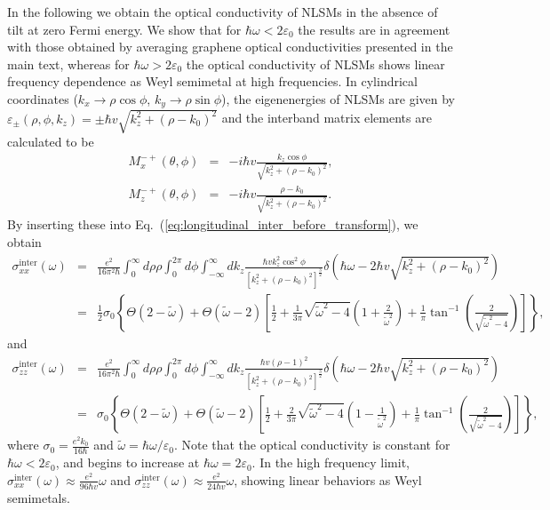 \documentclass[aps,twocolumn,floatfix]{revtex4-1}
\begin{document}
In the following we obtain the optical conductivity of NLSMs in the absence of tilt at zero Fermi energy. We show that for $\hbar\omega<2\varepsilon_0$ the results are in agreement with those obtained by averaging graphene optical conductivities presented in the main text, whereas for $\hbar\omega>2\varepsilon_0$ the optical conductivity of NLSMs shows linear frequency dependence as Weyl semimetal at high frequencies. In cylindrical coordinates ($k_x\rightarrow\rho \cos{\phi}$, $k_y\rightarrow\rho \sin{\phi}$), the eigenenergies of NLSMs are given by
$\varepsilon_\pm(\rho,\phi,k_z)=\pm \hbar v \sqrt{k_z^2 + (\rho-k_0)^2}$ and the interband matrix elements are calculated to be
\begin{eqnarray}
M_{x}^{-+}(\theta,\phi)&=&-i\hbar v\frac{k_z  \cos\phi}{\sqrt{k_z^2+(\rho-k_0)^2}},\\
M_{z}^{-+}(\theta,\phi)&=&-i\hbar v\frac{\rho-k_0 }{\sqrt{k_z^2+(\rho-k_0)^2}}.
\end{eqnarray}
By inserting these into Eq.~(\ref{eq:longitudinal_inter_before_transform}), we obtain
\begin{eqnarray}
    \sigma^\mathrm{inter}_{xx}(\omega)
    &=&
    \frac{e^2}{16\pi^2\hbar}
    \int_0^\infty d\rho \rho \int_0^{2\pi} d\phi \int_{-\infty}^\infty dk_z
    \frac{\hbar v k_z^2 \cos^2{\phi}}{[k_z^2+(\rho-k_0)^2]^{\frac{3}{2}}}
    \delta\left(\hbar\omega-2\hbar v \sqrt{k_z^2 + (\rho-k_0)^2}\right)\nonumber\\
    &=&
    \frac{1}{2}\sigma_0
    \left\{
        \Theta(2-\widetilde{\omega}) +
        \Theta(\widetilde{\omega}-2)
        \left[
            \frac{1}{2} + \frac{1}{3\pi}\sqrt{\widetilde{\omega}^2-4}
            \left(
                1+\frac{2}{\widetilde{\omega}^2}
            \right)
            +
            \frac{1}{\pi}
            \tan^{-1}\left(\frac{2}{\sqrt{\widetilde{\omega}^2-4}}\right)
        \right]
    \right\},
\end{eqnarray}
and
\begin{eqnarray}
    \sigma^\mathrm{inter}_{zz}(\omega)
    &=&
    \frac{e^2}{16\pi^2\hbar}
    \int_0^\infty d\rho \rho \int_0^{2\pi} d\phi \int_{-\infty}^\infty dk_z
    \frac{\hbar v (\rho-1)^2}{[k_z^2+(\rho-k_0)^2]^{\frac{3}{2}}}
    \delta\left(\hbar\omega-2\hbar v \sqrt{k_z^2 + (\rho-k_0)^2}\right)\nonumber\\
    &=&
    \sigma_0
    \left\{
        \Theta(2-\widetilde{\omega}) +
        \Theta(\widetilde{\omega}-2)
        \left[
            \frac{1}{2} + \frac{2}{3\pi}\sqrt{\widetilde{\omega}^2-4}
            \left(
                1-\frac{1}{\widetilde{\omega}^2}
            \right)
            +
            \frac{1}{\pi}
            \tan^{-1}\left(\frac{2}{\sqrt{\widetilde{\omega}^2-4}}\right)
        \right]
    \right\},
\end{eqnarray}
where $\sigma_0=\frac{e^2k_0}{16\hbar}$ and $\widetilde{\omega}=\hbar\omega/\varepsilon_0$.
Note that the optical conductivity is constant for $\hbar\omega<2\varepsilon_0$, and begins to increase at $\hbar\omega=2\varepsilon_0$. In the high frequency limit, $\sigma^\mathrm{inter}_{xx}(\omega)\approx\frac{e^2}{96\hbar v}\omega$ and $\sigma^\mathrm{inter}_{zz}(\omega)\approx\frac{e^2}{24\hbar v}\omega$, showing linear behaviors as Weyl semimetals.
\end{document}
